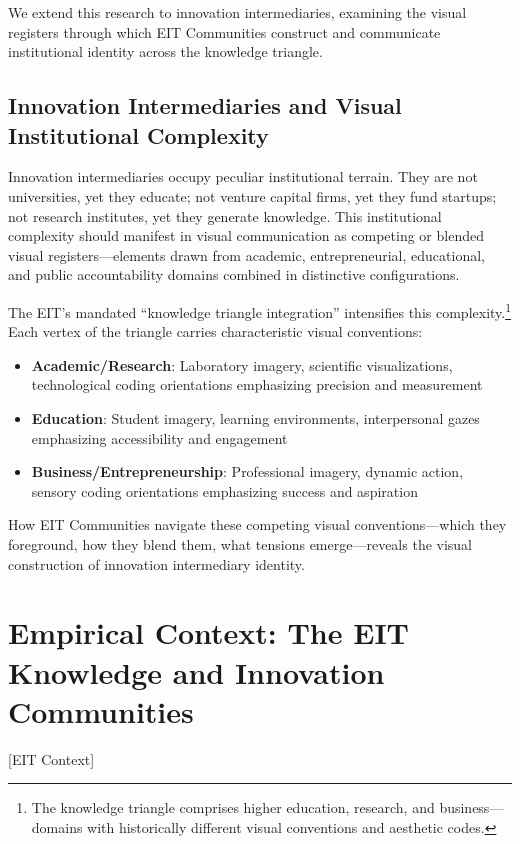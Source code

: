 \documentclass[../main.tex]{subfiles}
\begin{document}
We extend this research to innovation intermediaries, examining the visual registers through which EIT Communities construct and communicate institutional identity across the knowledge triangle.

\subsection{Innovation Intermediaries and Visual Institutional Complexity}

Innovation intermediaries occupy peculiar institutional terrain. They are not universities, yet they educate; not venture capital firms, yet they fund startups; not research institutes, yet they generate knowledge. This institutional complexity should manifest in visual communication as competing or blended visual registers---elements drawn from academic, entrepreneurial, educational, and public accountability domains combined in distinctive configurations.

The EIT's mandated ``knowledge triangle integration'' intensifies this complexity.\footnote{The knowledge triangle comprises higher education, research, and business---domains with historically different visual conventions and aesthetic codes.} Each vertex of the triangle carries characteristic visual conventions:

\begin{itemize}
    \item \textbf{Academic/Research}: Laboratory imagery, scientific visualizations, technological coding orientations emphasizing precision and measurement
    \item \textbf{Education}: Student imagery, learning environments, interpersonal gazes emphasizing accessibility and engagement
    \item \textbf{Business/Entrepreneurship}: Professional imagery, dynamic action, sensory coding orientations emphasizing success and aspiration
\end{itemize}

How EIT Communities navigate these competing visual conventions---which they foreground, how they blend them, what tensions emerge---reveals the visual construction of innovation intermediary identity.

\section{Empirical Context: The EIT Knowledge and Innovation Communities}[EIT Context]
\end{document}

